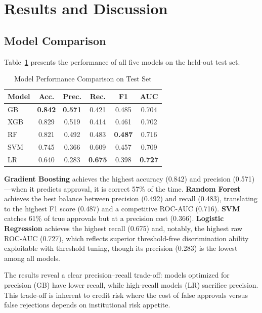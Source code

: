 \documentclass[journal]{IEEEtran}
\begin{document}
\section{Results and Discussion}

\subsection{Model Comparison}

Table~\ref{tab:model_results} presents the performance of all five models on the held-out test set.

\begin{table}[!t]
\centering
\caption{Model Performance Comparison on Test Set}
\label{tab:model_results}
\begin{tabular}{lccccc}
\toprule
\textbf{Model} & \textbf{Acc.} & \textbf{Prec.} & \textbf{Rec.} & \textbf{F1} & \textbf{AUC} \\
\midrule
GB  & \textbf{0.842} & \textbf{0.571} & 0.421 & 0.485 & 0.704 \\
XGB & 0.829 & 0.519 & 0.414 & 0.461 & 0.702 \\
RF  & 0.821 & 0.492 & 0.483 & \textbf{0.487} & 0.716 \\
SVM & 0.745 & 0.366 & 0.609 & 0.457 & 0.709 \\
LR  & 0.640 & 0.283 & \textbf{0.675} & 0.398 & \textbf{0.727} \\
\bottomrule
\end{tabular}
\end{table}

\textbf{Gradient Boosting} achieves the highest accuracy (0.842) and precision (0.571)---when it predicts approval, it is correct 57\% of the time. \textbf{Random Forest} achieves the best balance between precision (0.492) and recall (0.483), translating to the highest F1 score (0.487) and a competitive ROC-AUC (0.716). \textbf{SVM} catches 61\% of true approvals but at a precision cost (0.366). \textbf{Logistic Regression} achieves the highest recall (0.675) and, notably, the highest raw ROC-AUC (0.727), which reflects superior threshold-free discrimination ability exploitable with threshold tuning, though its precision (0.283) is the lowest among all models.

The results reveal a clear precision--recall trade-off: models optimized for precision (GB) have lower recall, while high-recall models (LR) sacrifice precision. This trade-off is inherent to credit risk where the cost of false approvals versus false rejections depends on institutional risk appetite.
\end{document}
